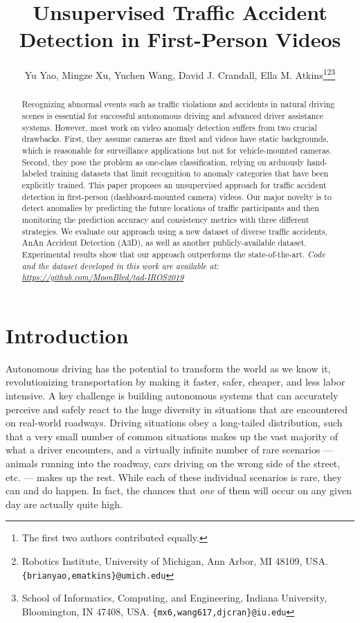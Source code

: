 \documentclass[letterpaper, 10 pt, conference]{ieeeconf}
\title{\LARGE \bf
Unsupervised Traffic Accident Detection in First-Person Videos
}
\author{Yu Yao, Mingze Xu, Yuchen Wang, David J. Crandall, Ella M. Atkins\thanks{The first two authors contributed equally.}\thanks{Robotics Institute, University of Michigan, Ann Arbor, MI 48109, USA.
{\tt\footnotesize \{brianyao,ematkins\}@umich.edu}}\thanks{School of Informatics, Computing, and Engineering, Indiana University, Bloomington, IN 47408, USA.
{\tt\footnotesize \{mx6,wang617,djcran\}@iu.edu}}}
\theoremstyle{definition}
\theoremstyle{remark}
\begin{document}
\maketitle
\thispagestyle{empty}
\pagestyle{empty}

\begin{abstract}
    Recognizing abnormal events such as traffic violations and
    accidents in natural driving scenes is essential for successful
    autonomous driving and advanced driver assistance systems. However, most
    work on video anomaly detection suffers from two crucial
    drawbacks.  First, they assume cameras are fixed and videos have
    static backgrounds, which is reasonable for surveillance
    applications but not for vehicle-mounted cameras.
    Second, they pose the problem as one-class classification, 
    relying on arduously hand-labeled training datasets that limit
    recognition to anomaly categories that have been explicitly trained.
    This paper proposes an unsupervised approach for traffic
    accident detection in first-person (dashboard-mounted camera) videos.
    Our major novelty is to detect anomalies by predicting the future
    locations of traffic participants and then monitoring the
    prediction accuracy and consistency metrics with three different
    strategies. We evaluate our approach using a new dataset of diverse traffic
    accidents, AnAn Accident Detection (A3D), as well as another
    publicly-available dataset. Experimental results show that our approach
    outperforms the state-of-the-art. \textit{Code and the dataset developed in this work are available at:
    \url{https://github.com/MoonBlvd/tad-IROS2019}}
\end{abstract}

\section{Introduction}

Autonomous driving has the potential to transform the world as we know
it, revolutionizing transportation by making it faster,
safer, cheaper, and less labor intensive. A key challenge is building
autonomous systems that can accurately perceive and
safely react to the huge diversity in situations that are encountered
on real-world roadways. Driving situations obey
a long-tailed distribution, such that a very small number of common
situations makes up the vast majority of what a driver encounters, and
a virtually infinite number of rare scenarios --- animals running into
the roadway, cars driving on the wrong side of the street, etc. ---
makes up the rest. While each of these individual scenarios is rare,
they can and do happen. In fact, the chances that \textit{one} of them
will occur on any given day are actually quite high.
\end{document}
